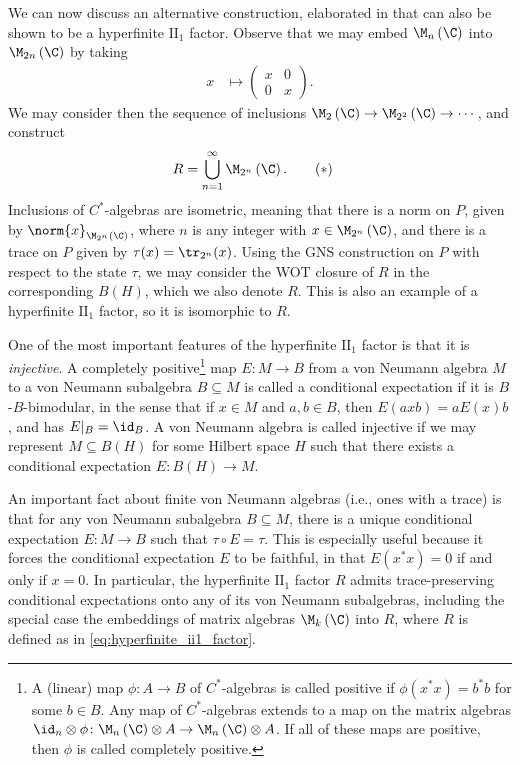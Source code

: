 \documentclass[10pt]{mypackage}
\begin{document}
We can now discuss an alternative construction, elaborated in \cite[Section 1.6]{ii1_factors_anantharaman_popa} that can also be shown to be a hyperfinite $\text{II}_1$ factor. Observe that we may embed $\M_n\left( \C \right)$ into $\M_{2n}\left( \C \right)$ by taking
\begin{align*}
  x &\mapsto \begin{pmatrix}x & 0 \\ 0 & x\end{pmatrix}.
\end{align*}
We may consider then the sequence of inclusions $\M_{2}\left( \C \right)\rightarrow \M_{2^2}\left( \C \right)\rightarrow\cdots$, and construct
\begin{align*}
  R &= \bigcup_{n=1}^{\infty} \M_{2^{n}}\left( \C \right).\label{eq:hyperfinite_ii1_factor}\tag{$\ast$}
\end{align*}
Inclusions of $C^{\ast}$-algebras are isometric, meaning that there is a norm on $P$, given by $\norm{x}_{\M_{2^n}\left( \C \right)}$, where $n$ is any integer with $x\in \M_{2^n}\left( \C \right)$, and there is a trace on $P$ given by $\tau(x) = \tr_{2^{n}}(x)$. Using the GNS construction on $P$ with respect to the state $\tau$, we may consider the WOT closure of $R$ in the corresponding $B\left( H \right)$, which we also denote $ R $. This is also an example of a hyperfinite $\text{II}_1$ factor, so it is isomorphic to $R$.

One of the most important features of the hyperfinite $\text{II}_1$ factor is that it is \textit{injective}. A completely positive\footnote{A (linear) map $\phi\colon A\rightarrow B$ of $C^{\ast}$-algebras is called positive if $\phi\left( x^{\ast}x \right) = b^{\ast}b$ for some $b\in B$. Any map of $C^{\ast}$-algebras extends to a map on the matrix algebras $\id_n\otimes\phi\colon \M_n\left( \C \right)\otimes A\rightarrow \M_n\left( \C \right)\otimes A$. If all of these maps are positive, then $\phi$ is called completely positive.} map $E\colon M\rightarrow B$ from a von Neumann algebra $M$ to a von Neumann subalgebra $B\subseteq M$ is called a conditional expectation if it is $B$-$B$-bimodular, in the sense that if $x\in M$ and $a,b\in B$, then $E\left( axb \right) = aE(x)b$, and has $E|_{B} = \id_B$. A von Neumann algebra is called injective if we may represent $M\subseteq B(H)$ for some Hilbert space $H$ such that there exists a conditional expectation $E\colon B(H)\rightarrow M$.

An important fact about finite von Neumann algebras (i.e., ones with a trace) is that for any von Neumann subalgebra $B\subseteq M$, there is a unique conditional expectation $E\colon M\rightarrow B$ such that $\tau\circ E = \tau$. This is especially useful because it forces the conditional expectation $E$ to be faithful, in that $E\left( x^{\ast}x \right) = 0$ if and only if $x = 0$. In particular, the hyperfinite $\text{II}_1$ factor $R$ admits trace-preserving conditional expectations onto any of its von Neumann subalgebras, including the special case the embeddings of matrix algebras $\M_k\left( \C \right)$ into $R$, where $R$ is defined as in \eqref{eq:hyperfinite_ii1_factor}.
\end{document}
